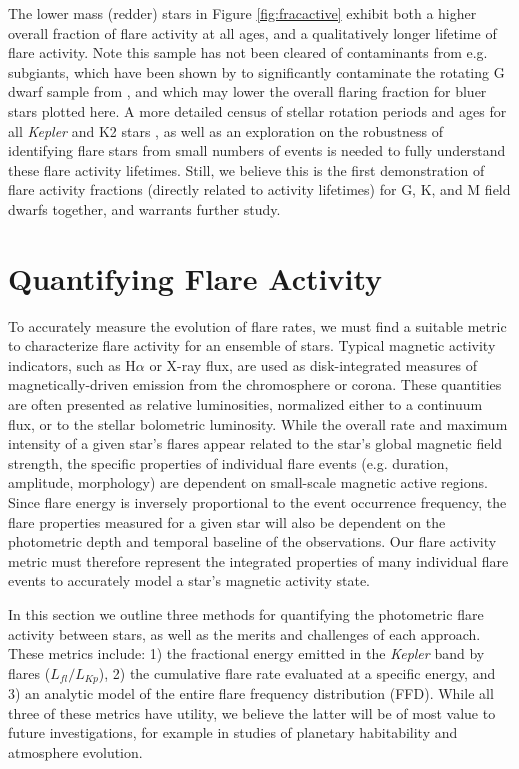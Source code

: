 \documentclass[preprint2]{aastex62}
\newcommand{\Kepler}{\textsl{Kepler}\xspace}
\begin{document}
The lower mass (redder) stars in Figure \ref{fig:fracactive} exhibit both a higher overall fraction of flare activity at all ages, and a qualitatively longer lifetime of flare activity. Note this sample has not been cleared of contaminants from e.g. subgiants, which have been shown by \citet{davenport2017} to significantly contaminate the rotating G dwarf sample from \citet{mcquillan2014}, and which may lower the overall flaring fraction for bluer stars plotted here.  A more detailed census of stellar rotation periods and ages for all \Kepler and K2 stars \citep[e.g. see][]{van-saders2018}, as well as an exploration on the robustness of identifying flare stars from small numbers of events is needed to fully understand these flare activity lifetimes.
Still, we believe this is the first demonstration of flare activity fractions (directly related to activity lifetimes) for G, K, and M field dwarfs together, and warrants further study.





\section{Quantifying Flare Activity}
\label{sec:activity}

To accurately measure the evolution of flare rates, we must find a suitable metric to characterize flare activity for an ensemble of stars. Typical magnetic activity indicators, such as H$\alpha$ or X-ray flux, are used as disk-integrated measures of magnetically-driven emission from the chromosphere or corona. These quantities are often presented as relative luminosities, normalized either to a continuum flux, or to the stellar bolometric luminosity.  
While the overall rate and maximum intensity of a given star's flares appear related to the star's global magnetic field strength, the specific properties of individual flare events (e.g. duration, amplitude, morphology) are dependent on small-scale magnetic active regions. Since flare energy is inversely proportional to the event occurrence frequency, the flare properties measured for a given star will also be dependent on the photometric depth and temporal baseline of the observations. Our flare activity metric must therefore represent the integrated properties of many individual flare events to accurately model a star's magnetic activity state.


In this section we outline three methods for quantifying the photometric flare activity between stars, as well as the merits and challenges of each approach. These metrics include: 1) the fractional energy emitted in the \Kepler band by flares ($L_{fl}/L_{Kp}$), 2) the cumulative flare rate evaluated at a specific energy, and 3) an analytic model of the entire flare frequency distribution (FFD). While all three of these metrics have utility, we believe the latter will be of most value to future investigations, for example in studies of planetary habitability and atmosphere evolution. 
\end{document}

